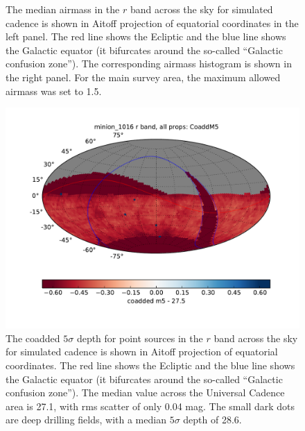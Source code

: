 \begin{figure}[tbh!]
\begin{subfigure}[b]{0.49\textwidth}
\end{subfigure}
\caption{The median airmass in the $r$ band across the sky for simulated cadence
 is shown in Aitoff projection of equatorial coordinates 
in the left panel. The red line shows the Ecliptic and the blue line shows the Galactic 
equator (it bifurcates around the so-called ``Galactic confusion zone''). The corresponding 
airmass histogram is shown in the right panel. For the main survey area, the maximum 
allowed airmass was set to 1.5. }
\label{fig:airmassenigma}
\end{figure}
 
\begin{figure}[t!]
\vskip -0.1in
\includegraphics[angle=0,width=0.99\hsize,clip]{figs/cadence/minion_1016_CoaddM5_r_band_all_props_OPSI_SkyMap.pdf}
\vskip -0.5in
\caption{The coadded $5\sigma$ depth for point sources in the $r$ band 
across the sky for simulated cadence  is shown 
in Aitoff projection of equatorial coordinates. The red line shows the Ecliptic and
the blue line shows the Galactic equator (it bifurcates around the so-called
``Galactic confusion zone''). The median value across the Universal Cadence area 
is 27.1, with rms scatter of only 0.04 mag. The small dark dots are deep drilling 
fields, with a median $5\sigma$ depth of 28.6.}
\label{fig:coaddm5enigma}
\end{figure}

